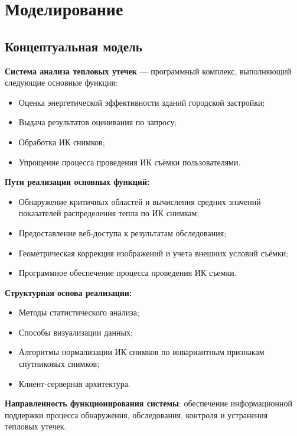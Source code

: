 \chapter{Моделирование}

\section{Концептуальная модель}

\textbf{Система анализа тепловых утечек} --- программный комплекс, выполняющий следующие основные функции:

\begin{itemize}
		\item Оценка энергетической эффективности зданий городской застройки;
		\item Выдача результатов оценивания по запросу;
		\item Обработка ИК снимков;
		\item Упрощение процесса проведения ИК съёмки пользователями.
\end{itemize}

\textbf{Пути реализации основных функций:}

\begin{itemize}
	\item Обнаружение критичных областей и вычисления средних значений показателей распределения тепла по ИК снимкам;
	\item Предоставление веб-доступа к результатам обследования;
	\item Геометрическая коррекция изображений и учета внешних условий съёмки;
	\item Программное обеспечение процесса проведения ИК съемки.
\end{itemize}
 
\textbf{Структурная основа реализации:}

\begin{itemize}
	\item Методы статистического анализа;
	\item Способы визуализации данных;
	\item Алгоритмы нормализации ИК снимков по инвариантным признакам спутниковых снимков;
	\item Клиент-серверная архитектура.
\end{itemize}

\textbf{Направленность функционирования системы}: обеспечение информационной поддержки процесса обнаружения, обследования, контроля и устранения тепловых утечек.
 
